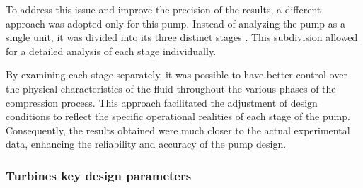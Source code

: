 To address this issue and improve the precision of the results, a different approach was adopted only for this pump. Instead of analyzing the pump as a single unit, it was divided into its three distinct stages \cite{presentation}. This subdivision allowed for a detailed analysis of each stage individually.

By examining each stage separately, it was possible to have better control over the physical characteristics of the fluid throughout the various phases of the compression process. This approach facilitated the adjustment of design conditions to reflect the specific operational realities of each stage of the pump. Consequently, the results obtained were much closer to the actual experimental data, enhancing the reliability and accuracy of the pump design.

\subsubsection{Turbines key design parameters}

